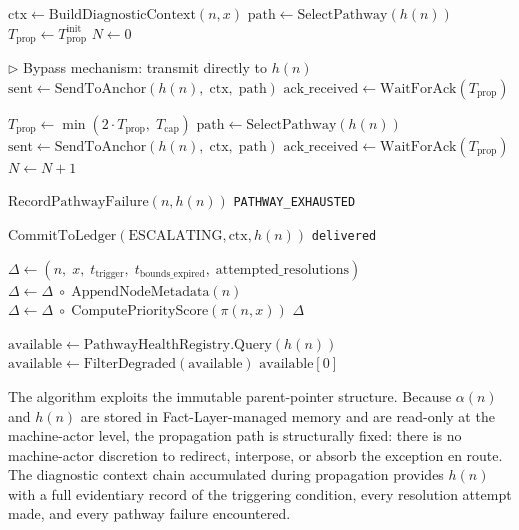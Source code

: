 \begin{algorithm}[htbp]
\caption{Bailout Protocol escalation algorithm.}
\label{alg:escalate}
\begin{algorithmic}[1]
  \State $\text{ctx} \leftarrow \text{BuildDiagnosticContext}(n, x)$
  \State $\text{path} \leftarrow \text{SelectPathway}(h(n))$
  \State $T_{\text{prop}} \leftarrow T_{\text{prop}}^{\text{init}}$
  \State $N \leftarrow 0$

  \State $\triangleright$ Bypass mechanism: transmit directly to $h(n)$
  \State $\text{sent} \leftarrow \text{SendToAnchor}(h(n),\; \text{ctx},\; \text{path})$
  \State $\text{ack\_received} \leftarrow \text{WaitForAck}(T_{\text{prop}})$

    \State $T_{\text{prop}} \leftarrow \min(2 \cdot T_{\text{prop}},\; T_{\text{cap}})$
    \State $\text{path} \leftarrow \text{SelectPathway}(h(n))$
    \State $\text{sent} \leftarrow \text{SendToAnchor}(h(n),\; \text{ctx},\; \text{path})$
    \State $\text{ack\_received} \leftarrow \text{WaitForAck}(T_{\text{prop}})$
    \State $N \leftarrow N + 1$

      \State $\text{RecordPathwayFailure}(n, h(n))$
      \State \Return \texttt{PATHWAY\_EXHAUSTED}
    \EndIf
  \EndWhile

  \State $\text{CommitToLedger}(\text{ESCALATING}, \text{ctx}, h(n))$
  \State \Return \texttt{delivered}
\EndProcedure

\bigskip
{}
  \State $\Delta \leftarrow (n,\; x,\; t_{\text{trigger}},\; t_{\text{bounds\_expired}},\; \text{attempted\_resolutions})$
  \State $\Delta \leftarrow \Delta \;\circ\; \text{AppendNodeMetadata}(n)$
  \State $\Delta \leftarrow \Delta \;\circ\; \text{ComputePriorityScore}(\pi(n, x))$
  \State \Return $\Delta$
\EndProcedure

\bigskip
{}
  \State $\text{available} \leftarrow \text{PathwayHealthRegistry.Query}(h(n))$
  \State $\text{available} \leftarrow \text{FilterDegraded}(\text{available})$
  \State \Return $\text{available}[0]$ 
\EndProcedure
\end{algorithmic}
\end{algorithm}

The algorithm exploits the immutable parent-pointer structure. Because $\alpha(n)$ and $h(n)$ are stored in Fact-Layer-managed memory and are read-only at the machine-actor level, the propagation path is structurally fixed: there is no machine-actor discretion to redirect, interpose, or absorb the exception en route. The diagnostic context chain accumulated during propagation provides $h(n)$ with a full evidentiary record of the triggering condition, every resolution attempt made, and every pathway failure encountered.

